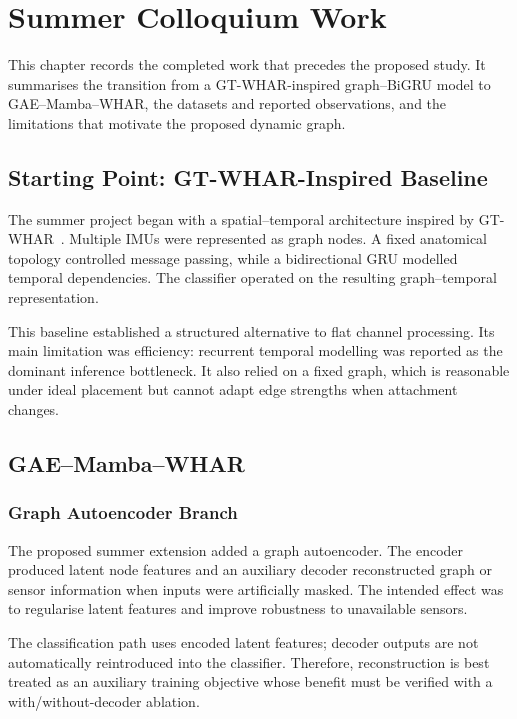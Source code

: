 \documentclass[12pt,a4paper,twoside,openright]{report}
\begin{document}
\cleardoublepage
\chapter{Summer Colloquium Work}

This chapter records the completed work that precedes the proposed study. It summarises the transition from a GT-WHAR-inspired graph--BiGRU model to GAE--Mamba--WHAR, the datasets and reported observations, and the limitations that motivate the proposed dynamic graph.

\section{Starting Point: GT-WHAR-Inspired Baseline}
The summer project began with a spatial--temporal architecture inspired by GT-WHAR~\cite{gtwhar,summerreport}. Multiple IMUs were represented as graph nodes. A fixed anatomical topology controlled message passing, while a bidirectional GRU modelled temporal dependencies. The classifier operated on the resulting graph--temporal representation.

This baseline established a structured alternative to flat channel processing. Its main limitation was efficiency: recurrent temporal modelling was reported as the dominant inference bottleneck. It also relied on a fixed graph, which is reasonable under ideal placement but cannot adapt edge strengths when attachment changes.

\section{GAE--Mamba--WHAR}

\subsection{Graph Autoencoder Branch}
The proposed summer extension added a graph autoencoder. The encoder produced latent node features and an auxiliary decoder reconstructed graph or sensor information when inputs were artificially masked. The intended effect was to regularise latent features and improve robustness to unavailable sensors.

The classification path uses encoded latent features; decoder outputs are not automatically reintroduced into the classifier. Therefore, reconstruction is best treated as an auxiliary training objective whose benefit must be verified with a with/without-decoder ablation.
\end{document}
